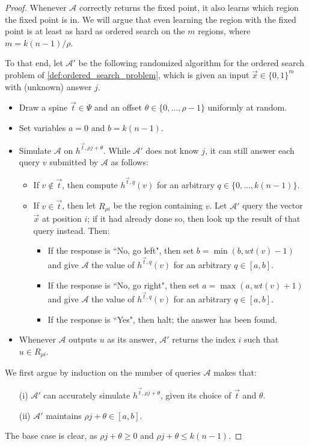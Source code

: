 \documentclass[11pt]{article}
\begin{document}
\begin{proof}
    Whenever $\mathcal{A}$ correctly returns the fixed point, it also learns which region the fixed point is in. We will argue that even learning the region with the fixed point is at least as hard as ordered search on the $m$ regions, where $m = k(n-1) / \rho$.

    To that end, let $\mathcal{A}'$ be the following randomized algorithm for the ordered search problem of \cref{def:ordered_search_problem}, which is given an input $\vec{x} \in \{0, 1\}^m$ with (unknown) answer $j$.
\begin{itemize}
    \item Draw a spine $\vec{t} \in \Psi$ and an offset $\theta \in \{0, \ldots, \rho - 1\}$ uniformly at random. 
    \item Set variables $a = 0$ and $b = k(n-1)$.
    \item Simulate $\mathcal{A}$ on $h^{\vec{t}, \rho j + \theta}$. While $\mathcal{A}'$ does not know $j$, it can still answer each query $v$ submitted by $\mathcal{A}$ as follows:
    \begin{itemize}
        \item If $v \notin \vec{t}$, then compute $h^{\vec{t}, q}(v)$ for an arbitrary $q \in \{0, \ldots, k(n-1)\}$.
        \item If $v \in \vec{t}$, then let $R_{\rho i}$ be the region containing $v$.  Let $\mathcal{A}'$ query the vector $\vec{x}$ at position $i$; if it had already done so, then look up the result of that query instead. Then:
        \begin{itemize}
            \item If the response is ``No, go left", then set $b = \min(b, wt(v)-1)$ and give $\mathcal{A}$ the value of $h^{\vec{t}, q}(v)$ for an arbitrary $q \in [a, b]$.
            \item If the response is ``No, go right", then set $a = \max(a, wt(v)+1)$ and give $\mathcal{A}$ the value of $h^{\vec{t}, q}(v)$ for an arbitrary $q \in [a, b]$.
            \item If the response is ``Yes", then halt; the answer has been found.
        \end{itemize}
    \end{itemize}
    \item Whenever $\mathcal{A}$ outputs $u$ as its answer, $\mathcal{A}'$ returns the index $i$ such that $u \in R_{\rho i}$.
\end{itemize}

We first argue by induction on the number of queries $\mathcal{A}$ makes that:
\begin{itemize}
    \item[(i)] $\mathcal{A}'$ can accurately simulate $h^{\vec{t}, \rho j + \theta}$, given its choice of $\vec{t}$ and $\theta$.
    \item[(ii)] $\mathcal{A}'$ maintains $\rho j + \theta \in [a, b]$.
\end{itemize}
The base case is clear, as $\rho j + \theta \geq 0$ and $\rho j + \theta \leq k(n-1)$.


\end{proof}
\end{document}
